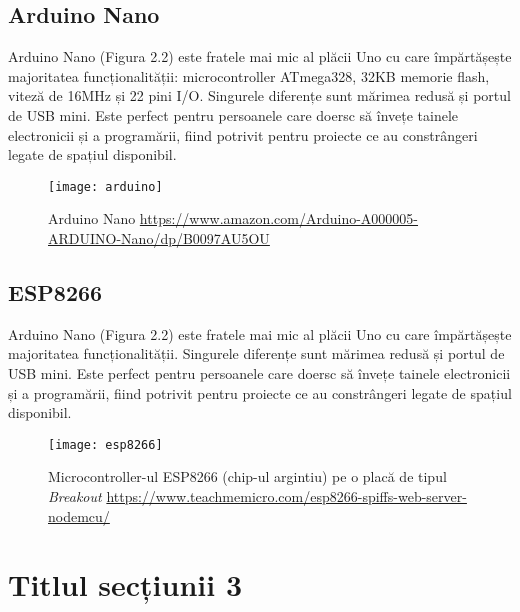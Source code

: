 \subsection{Arduino Nano}

Arduino Nano (Figura 2.2) este fratele mai mic al plăcii Uno cu care împărtășește majoritatea funcționalității: microcontroller ATmega328, 32KB memorie flash, viteză de 16MHz și 22 pini I/O.  Singurele diferențe sunt mărimea redusă și portul de USB mini. Este perfect pentru persoanele care doersc să învețe tainele electronicii și a programării, fiind potrivit pentru proiecte ce au constrângeri legate de spațiul disponibil.

\begin{figure}[h]
	\centering
	\texttt{[image: arduino]}
	\caption{Arduino Nano \newline\url{https://www.amazon.com/Arduino-A000005-ARDUINO-Nano/dp/B0097AU5OU}}
	\label{fig:arduino}
\end{figure}

\subsection{ESP8266}

Arduino Nano (Figura 2.2) este fratele mai mic al plăcii Uno cu care împărtășește majoritatea funcționalității. Singurele diferențe sunt mărimea redusă și portul de USB mini. Este perfect pentru persoanele care doersc să învețe tainele electronicii și a programării, fiind potrivit pentru proiecte ce au constrângeri legate de spațiul disponibil.

\begin{figure}[h]
	\centering
	\texttt{[image: esp8266]}
	\caption{Microcontroller-ul ESP8266 (chip-ul argintiu) pe o placă de tipul \emph{Breakout} \newline\url{https://www.teachmemicro.com/esp8266-spiffs-web-server-nodemcu/}}
	\label{fig:esp8266}
\end{figure}

\break

\section{Titlul secțiunii 3}

